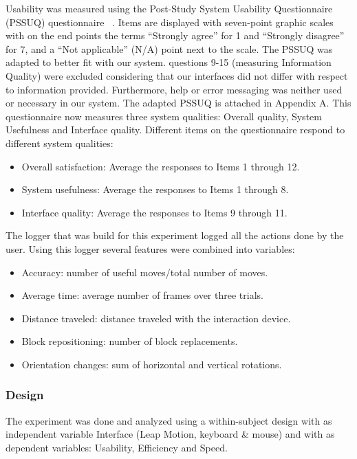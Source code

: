Usability was measured using the Post-Study System Usability Questionnaire (PSSUQ) questionnaire ~\cite{lewis1992psychometric}. Items are displayed with seven-point graphic 
scales with on the end points the terms “Strongly agree” for 1 and “Strongly disagree” for 7, and a “Not applicable” (N/A) point next to the scale. The PSSUQ was adapted to 
better fit with our system. questions 9-15 (measuring Information Quality) were excluded considering that our interfaces did not differ with respect to information provided. 
Furthermore, help or error messaging was neither used or necessary in our system. The adapted PSSUQ is attached in Appendix A. This questionnaire now measures three system 
qualities: Overall quality, System Usefulness and Interface quality.  Different items on the questionnaire respond to different system qualities:
\begin{itemize}
	\item Overall satisfaction: Average the responses to Items 1 through 12.
	\item System usefulness: Average the responses to Items 1 through 8.
    \item Interface quality: Average the responses to Items 9 through 11.
\end{itemize}

The logger that was build for this experiment logged all the actions done by the user. Using this logger several features were combined into variables: 
\begin{itemize}
	\item Accuracy: number of useful moves/total number of moves.
	\item Average time: average number of frames over three trials.    
	\item Distance traveled: distance traveled with the interaction device.
    \item Block repositioning: number of block replacements.
    \item Orientation changes: sum of horizontal and vertical rotations.
\end{itemize}


\subsubsection{Design}
The experiment was done and analyzed using a within-subject design with as independent variable Interface (Leap Motion, keyboard \& mouse) and with as dependent variables: 
Usability, Efficiency and Speed. 

